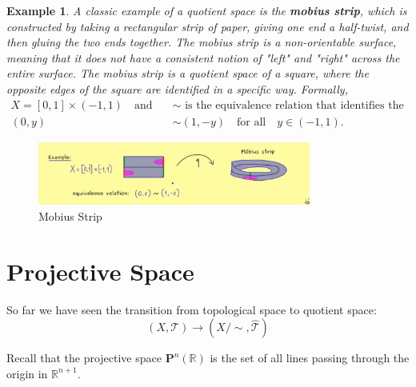 \documentclass[11pt]{book} %
\newtheorem*{example*}{Example}
\begin{document}
\begin{example*} A classic example of a quotient space is the \textbf{mobius strip}, which is constructed by taking a rectangular strip of paper, 
    giving one end a half-twist, and then gluing the two ends together. The mobius strip is a non-orientable surface, 
    meaning that it does not have a consistent notion of "left" and "right" across the entire surface. 
    The mobius strip is a quotient space of a square, where the opposite edges of the square are identified in a specific way.
    Formally, 
    \begin{align*}
        X = [0, 1] \times (-1, 1) \quad \text{and} \quad &\sim \text{ is the equivalence relation that identifies the points} \\
        (0, y) &\sim (1, -y) \quad \text{for all} \quad y \in (-1, 1).
    \end{align*}
\end{example*}

\begin{figure}[H]
    \centering
    \includegraphics[width=0.8\textwidth]{Figs/mobius_strip.png}
    \caption{Mobius Strip}
\end{figure}



\section{Projective Space}

So far we have seen the transition from topological space to quotient space:
\begin{equation*}
    (X, \mathcal{T}) \to (X/\sim, \hat{\mathcal{T}})
\end{equation*}

Recall that the projective space \( \mathbf{P}^n (\mathbb{R}) \) is the set of all lines passing through the origin in \( \mathbb{R}^{n+1} \).
\end{document}
